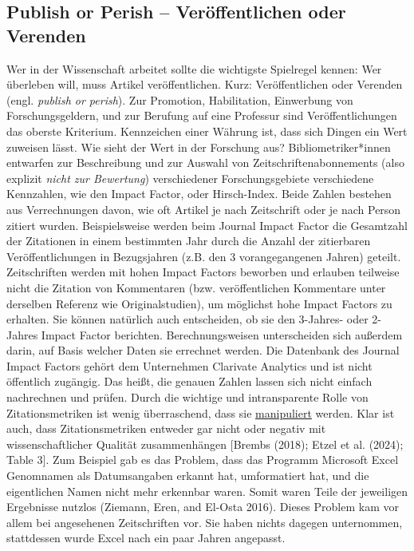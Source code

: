\documentclass[
  letterpaper,
  DIV=11,
  numbers=noendperiod]{scrreprt}
\begin{document}
\subsection{Publish or Perish -- Veröffentlichen oder
Verenden}\label{publish-or-perish-veruxf6ffentlichen-oder-verenden}

Wer in der Wissenschaft arbeitet sollte die wichtigste Spielregel
kennen: Wer überleben will, muss Artikel veröffentlichen. Kurz:
Veröffentlichen oder Verenden (engl. \emph{publish or perish}). Zur
Promotion, Habilitation, Einwerbung von Forschungsgeldern, und zur
Berufung auf eine Professur sind Veröffentlichungen das oberste
Kriterium. Kennzeichen einer Währung ist, dass sich Dingen ein Wert
zuweisen lässt. Wie sieht der Wert in der Forschung aus?
Bibliometriker*innen entwarfen zur Beschreibung und zur Auswahl von
Zeitschriftenabonnements (also explizit \emph{nicht zur Bewertung})
verschiedener Forschungsgebiete verschiedene Kennzahlen, wie den Impact
Factor, oder Hirsch-Index. Beide Zahlen bestehen aus Verrechnungen
davon, wie oft Artikel je nach Zeitschrift oder je nach Person zitiert
wurden. Beispielsweise werden beim Journal Impact Factor die Gesamtzahl
der Zitationen in einem bestimmten Jahr durch die Anzahl der zitierbaren
Veröffentlichungen in Bezugsjahren (z.B. den 3 vorangegangenen Jahren)
geteilt. Zeitschriften werden mit hohen Impact Factors beworben und
erlauben teilweise nicht die Zitation von Kommentaren (bzw.
veröffentlichen Kommentare unter derselben Referenz wie
Originalstudien), um möglichst hohe Impact Factors zu erhalten. Sie
können natürlich auch entscheiden, ob sie den 3-Jahres- oder 2-Jahres
Impact Factor berichten. Berechnungsweisen unterscheiden sich außerdem
darin, auf Basis welcher Daten sie errechnet werden. Die Datenbank des
Journal Impact Factors gehört dem Unternehmen Clarivate Analytics und
ist nicht öffentlich zugängig. Das heißt, die genauen Zahlen lassen sich
nicht einfach nachrechnen und prüfen. Durch die wichtige und
intransparente Rolle von Zitationsmetriken ist wenig überraschend, dass
sie
\href{https://quantixed.org/2016/01/05/the-great-curve-ii-citation-distributions-and-reverse-engineering-the-jif}{manipuliert}
werden. Klar ist auch, dass Zitationsmetriken entweder gar nicht oder
negativ mit wissenschaftlicher Qualität zusammenhängen {[}Brembs (2018);
Etzel et al. (2024); Table 3{]}. Zum Beispiel gab es das Problem, dass
das Programm Microsoft Excel Genomnamen als Datumsangaben erkannt hat,
umformatiert hat, und die eigentlichen Namen nicht mehr erkennbar waren.
Somit waren Teile der jeweiligen Ergebnisse nutzlos (Ziemann, Eren, and
El-Osta 2016). Dieses Problem kam vor allem bei angesehenen
Zeitschriften vor. Sie haben nichts dagegen unternommen, stattdessen
wurde Excel nach ein paar Jahren angepasst.
\end{document}
